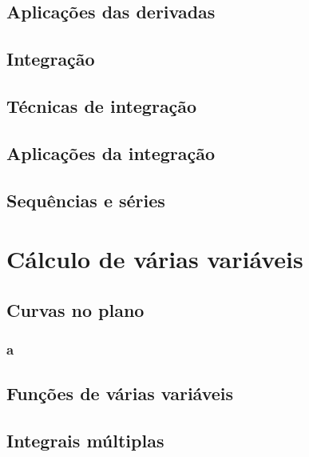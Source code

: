\documentclass[12pt]{book}
\begin{document}
\chapter{Aplicações das derivadas}

\chapter{Integração}

\chapter{Técnicas de integração}

\chapter{Aplicações da integração}

\chapter{Sequências e séries} 


\part{Cálculo de várias variáveis}

\chapter{Curvas no plano}
\section {a}


 

\chapter{Funções de várias variáveis}

\chapter{Integrais múltiplas}
\end{document}
